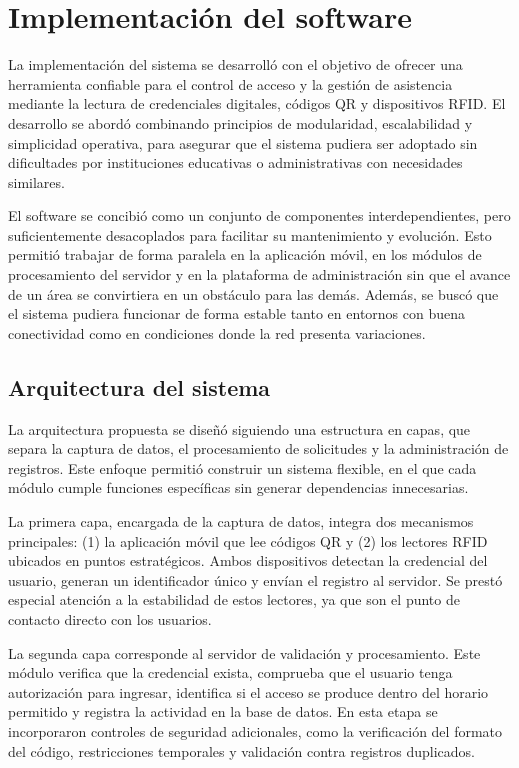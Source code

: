 \section{Implementación del software}
La implementación del sistema se desarrolló con el objetivo de ofrecer una herramienta confiable para el control de acceso y la gestión de asistencia mediante la lectura de credenciales digitales, códigos QR y dispositivos RFID. El desarrollo se abordó combinando principios de modularidad, escalabilidad y simplicidad operativa, para asegurar que el sistema pudiera ser adoptado sin dificultades por instituciones educativas o administrativas con necesidades similares.

El software se concibió como un conjunto de componentes interdependientes, pero suficientemente desacoplados para facilitar su mantenimiento y evolución. Esto permitió trabajar de forma paralela en la aplicación móvil, en los módulos de procesamiento del servidor y en la plataforma de administración sin que el avance de un área se convirtiera en un obstáculo para las demás. Además, se buscó que el sistema pudiera funcionar de forma estable tanto en entornos con buena conectividad como en condiciones donde la red presenta variaciones.

\subsection{Arquitectura del sistema}
La arquitectura propuesta se diseñó siguiendo una estructura en capas, que separa la captura de datos, el procesamiento de solicitudes y la administración de registros. Este enfoque permitió construir un sistema flexible, en el que cada módulo cumple funciones específicas sin generar dependencias innecesarias.

La primera capa, encargada de la captura de datos, integra dos mecanismos principales: (1) la aplicación móvil que lee códigos QR y (2) los lectores RFID ubicados en puntos estratégicos. Ambos dispositivos detectan la credencial del usuario, generan un identificador único y envían el registro al servidor. Se prestó especial atención a la estabilidad de estos lectores, ya que son el punto de contacto directo con los usuarios.

La segunda capa corresponde al servidor de validación y procesamiento. Este módulo verifica que la credencial exista, comprueba que el usuario tenga autorización para ingresar, identifica si el acceso se produce dentro del horario permitido y registra la actividad en la base de datos. En esta etapa se incorporaron controles de seguridad adicionales, como la verificación del formato del código, restricciones temporales y validación contra registros duplicados.

